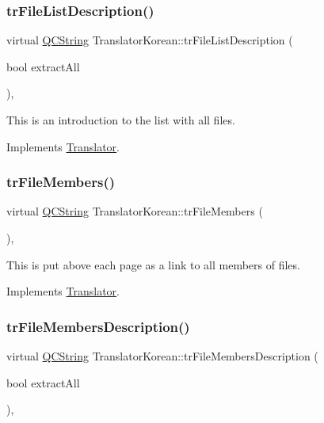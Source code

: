 \subsubsection{\texorpdfstring{trFileListDescription()}{trFileListDescription()}}
{\footnotesize\ttfamily virtual \mbox{\hyperlink{class_q_c_string}{Q\+C\+String}} Translator\+Korean\+::tr\+File\+List\+Description (\begin{DoxyParamCaption}\item[{bool}]{extract\+All }\end{DoxyParamCaption})\hspace{0.3cm}{\ttfamily [inline]}, {\ttfamily [virtual]}}

This is an introduction to the list with all files. 

Implements \mbox{\hyperlink{class_translator}{Translator}}.

\mbox{\label{class_translator_korean_a491409a10a59c8bf78bd993a2f566686}} 
\subsubsection{\texorpdfstring{trFileMembers()}{trFileMembers()}}
{\footnotesize\ttfamily virtual \mbox{\hyperlink{class_q_c_string}{Q\+C\+String}} Translator\+Korean\+::tr\+File\+Members (\begin{DoxyParamCaption}{ }\end{DoxyParamCaption})\hspace{0.3cm}{\ttfamily [inline]}, {\ttfamily [virtual]}}

This is put above each page as a link to all members of files. 

Implements \mbox{\hyperlink{class_translator}{Translator}}.

\mbox{\label{class_translator_korean_a372e6e556b533425358effd137e604f7}} 
\subsubsection{\texorpdfstring{trFileMembersDescription()}{trFileMembersDescription()}}
{\footnotesize\ttfamily virtual \mbox{\hyperlink{class_q_c_string}{Q\+C\+String}} Translator\+Korean\+::tr\+File\+Members\+Description (\begin{DoxyParamCaption}\item[{bool}]{extract\+All }\end{DoxyParamCaption})\hspace{0.3cm}{\ttfamily [inline]}, {\ttfamily [virtual]}}


